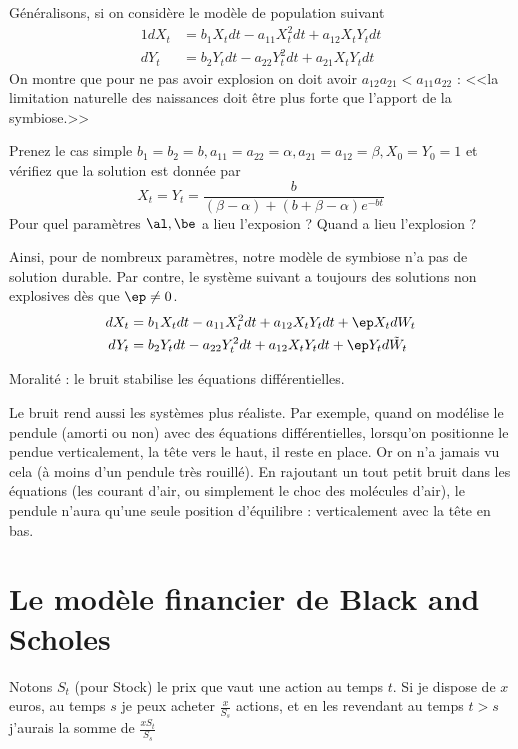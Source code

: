 \documentclass{article}
\begin{document}
Généralisons, si on considère le modèle de population suivant 
\begin{alignat*}{1}
dX_t &=  b_1 X_t dt   -  a_{11} X^2_t dt  + a_{12} X_tY_t  dt  \\
dY_t &=  b_2 Y_t dt   -  a_{22} Y^2_t dt + a_{21}X_tY_t dt
\end{alignat*}
On montre que pour ne pas avoir  explosion on doit avoir $a_{12} a_{21}< a_{11}a_{22}$  : <<la limitation naturelle des naissances doit être plus forte que l'apport  de la symbiose.>>

\begin{exo} Prenez le cas simple  $b_1=b_2=b,  a_{11}=a_{22}=\alpha, a_{21}=a_{12}=\beta, X_0=Y_0=1$ et vérifiez que la solution est donnée par 
$$
X_t = Y_t = \frac{b}{(\beta -\alpha) + (b+\beta-\alpha)e^{-bt}  }
$$ 
Pour quel paramètres $\al,\be$ a lieu l'exposion ? Quand a lieu l'explosion ? 
\end{exo}

Ainsi, pour de nombreux paramètres, notre modèle de symbiose n'a pas de solution durable. Par contre, le système suivant a toujours des solutions non explosives dès que $\ep\neq0$. 
\begin{alignat*}{1}
dX_t &=  b_1 X_t dt   -  a_{11} X^2_t dt  + a_{12} X_tY_t  dt   +\ep X_t dW_t  \\
dY_t &=  b_2 Y_t dt   -  a_{22} Y^2_t dt + a_{12}X_tY_t dt  +\ep Y_t d\tilde W_t
\end{alignat*}
 
Moralité : le bruit stabilise les équations différentielles.  

Le bruit rend aussi les systèmes plus réaliste. Par exemple, quand on modélise le pendule (amorti ou non) avec des équations différentielles, lorsqu'on positionne le pendue verticalement, la tête vers le haut, il reste en place. Or on n'a jamais vu cela (à moins d'un pendule très rouillé).   En rajoutant un tout petit bruit dans les équations (les courant d'air, ou simplement le choc des molécules d'air), le pendule n'aura qu'une seule position d'équilibre : verticalement avec la tête en bas. 



\section{Le modèle financier de Black and Scholes}


Notons  $S_t$ (pour Stock) le   prix  que vaut une action  au temps $t$.     Si je dispose de $x$ euros, au temps $s$ je peux acheter $\frac{x}{S_s}$  actions, et en les revendant au temps $t>s$  j'aurais la somme de $\frac{xS_t}{S_s}$
 
\end{document}
